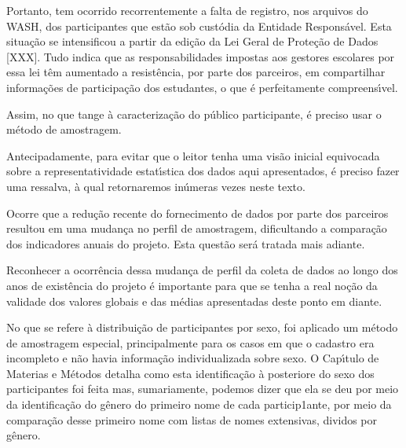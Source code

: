 \documentclass[
12pt,		%
openright,	%
twoside,  %
a4paper,			%
chapter=TITLE,		%
english,			%
french,				%
spanish,			%
brazil				%
]{USPSC-classe/USPSC_RedarTex}
\begin{document}
Portanto, tem ocorrido recorrentemente a falta de registro, nos arquivos do WASH, dos participantes que est\~ao sob cust\'odia da Entidade Respons\'avel. Esta situa\c{c}\~ao se intensificou a partir da edi\c{c}\~ao da Lei Geral de Prote\c{c}\~ao de Dados [XXX]. Tudo indica que as responsabilidades impostas aos gestores escolares por essa lei t\^em aumentado a  resist\^encia, por parte dos parceiros, em compartilhar informa\c{c}\~oes de participa\c{c}\~ao dos estudantes, o que \'e perfeitamente compreens\'{\i}vel.










Assim, no que tange \`a caracteriza\c{c}\~ao do p\'ublico participante, \'e preciso usar o m\'etodo de amostragem.










Antecipadamente, para evitar que o leitor tenha uma vis\~ao inicial equivocada sobre a representatividade estat\'{\i}stica dos dados aqui apresentados, \'e preciso fazer uma ressalva, \`a qual retornaremos in\'umeras vezes neste texto.










Ocorre que a redu\c{c}\~ao recente do fornecimento de dados por parte dos parceiros resultou em uma mudan\c{c}a no perfil de amostragem, dificultando a compara\c{c}\~ao dos indicadores anuais do projeto. Esta quest\~ao ser\'a tratada mais adiante.










Reconhecer a ocorr\^encia dessa mudan\c{c}a de perfil da coleta de dados ao longo dos anos de exist\^encia do projeto \'e importante para que se tenha a real no\c{c}\~ao da validade dos valores globais e das m\'edias apresentadas deste ponto em diante.










No que se refere \`a distribui\c{c}\~ao de participantes por sexo, foi aplicado um m\'etodo de amostragem especial, principalmente para os casos em que o cadastro era incompleto e n\~ao havia informa\c{c}\~ao individualizada sobre sexo. O Cap\'{\i}tulo de Materias e M\'etodos detalha como esta identifica\c{c}\~ao \`a posteriore do sexo dos participantes foi feita mas, sumariamente, podemos dizer que ela se deu por meio da identifica\c{c}\~ao do g\^enero do primeiro nome de cada particip1ante, por meio da compara\c{c}\~ao desse primeiro nome com listas de nomes extensivas, dividos por g\^enero.
\end{document}
